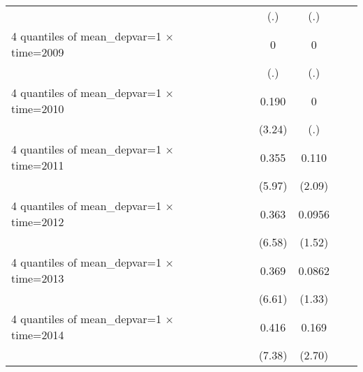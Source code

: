 \begin{table}[htbp]
\begin{tabular}{l*{6}{c}}
                    &                     &                     &         (.)         &         (.)         &                     &                     \\
[1em]
4 quantiles of mean\_depvar=1 $\times$ time=2009&                     &                     &           0         &           0         &                     &                     \\
                    &                     &                     &         (.)         &         (.)         &                     &                     \\
[1em]
4 quantiles of mean\_depvar=1 $\times$ time=2010&                     &                     &       0.190\sym{***}&           0         &                     &                     \\
                    &                     &                     &      (3.24)         &         (.)         &                     &                     \\
[1em]
4 quantiles of mean\_depvar=1 $\times$ time=2011&                     &                     &       0.355\sym{***}&       0.110\sym{**} &                     &                     \\
                    &                     &                     &      (5.97)         &      (2.09)         &                     &                     \\
[1em]
4 quantiles of mean\_depvar=1 $\times$ time=2012&                     &                     &       0.363\sym{***}&      0.0956         &                     &                     \\
                    &                     &                     &      (6.58)         &      (1.52)         &                     &                     \\
[1em]
4 quantiles of mean\_depvar=1 $\times$ time=2013&                     &                     &       0.369\sym{***}&      0.0862         &                     &                     \\
                    &                     &                     &      (6.61)         &      (1.33)         &                     &                     \\
[1em]
4 quantiles of mean\_depvar=1 $\times$ time=2014&                     &                     &       0.416\sym{***}&       0.169\sym{**} &                     &                     \\
                    &                     &                     &      (7.38)         &      (2.70)         &                     &                     \\

\end{tabular}
\end{table}
